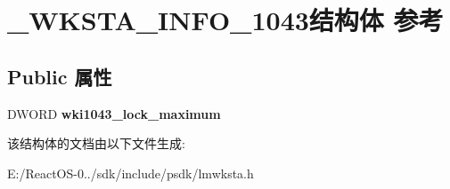 \hypertarget{struct___w_k_s_t_a___i_n_f_o__1043}{}\section{\+\_\+\+W\+K\+S\+T\+A\+\_\+\+I\+N\+F\+O\+\_\+1043结构体 参考}
\label{struct___w_k_s_t_a___i_n_f_o__1043}
\subsection*{Public 属性}
\begin{DoxyCompactItemize}
\item 
\mbox{\label{struct___w_k_s_t_a___i_n_f_o__1043_af81e980d273a5611d48d1af380f57c8b}} 
D\+W\+O\+RD {\bfseries wki1043\+\_\+lock\+\_\+maximum}
\end{DoxyCompactItemize}


该结构体的文档由以下文件生成\+:\begin{DoxyCompactItemize}
\item 
E\+:/\+React\+O\+S-\/0../sdk/include/psdk/lmwksta.\+h\end{DoxyCompactItemize}
